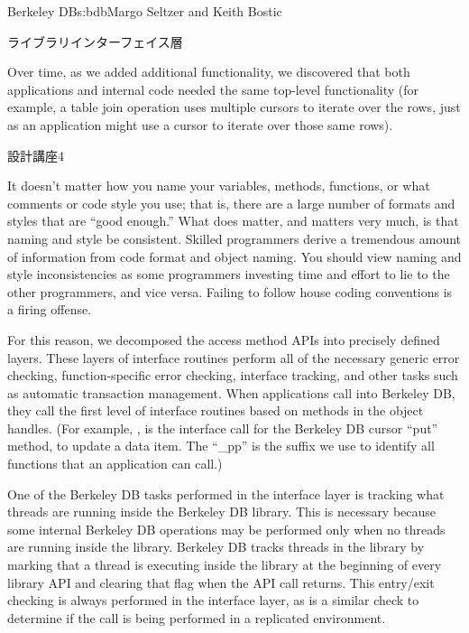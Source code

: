 \begin{aosachapter}{Berkeley DB}{s:bdb}{Margo Seltzer and Keith Bostic}
\begin{aosasect1}{ライブラリインターフェイス層}
\label{sec.bdb.int}

Over time, as we added additional functionality, we discovered that
both applications and internal code needed the same top-level
functionality (for example, a table join operation uses multiple
cursors to iterate over the rows, just as an application might use a
cursor to iterate over those same rows).

\begin{aosabox}{設計講座4}

It doesn't matter how you name your variables, methods, functions, or
what comments or code style you use; that is, there are a large number
of formats and styles that are ``good enough.'' What does matter, and
matters very much, is that naming and style be consistent. Skilled
programmers derive a tremendous amount of information from code format
and object naming. You should view naming and style inconsistencies as
some programmers investing time and effort to lie to the other
programmers, and vice versa. Failing to follow house coding
conventions is a firing offense.

\end{aosabox}

For this reason, we decomposed the access method APIs into precisely
defined layers. These layers of interface routines perform all of the
necessary generic error checking, function-specific error checking,
interface tracking, and other tasks such as automatic transaction
management. When applications call into Berkeley DB, they call the
first level of interface routines based on methods in the object
handles. (For example, , is the interface call
for the Berkeley DB cursor ``put'' method, to update a data item. The
``\_pp'' is the suffix we use to identify all functions that an
application can call.) 

One of the Berkeley DB tasks performed in the interface layer is
tracking what threads are running inside the Berkeley DB library. This
is necessary because some internal Berkeley DB operations may be
performed only when no threads are running inside the
library. Berkeley DB tracks threads in the library by marking that a
thread is executing inside the library at the beginning of every
library API and clearing that flag when the API call returns. This
entry/exit checking is always performed in the interface layer, as is
a similar check to determine if the call is being performed in a
replicated environment.


\end{aosasect1}
\end{aosachapter}
